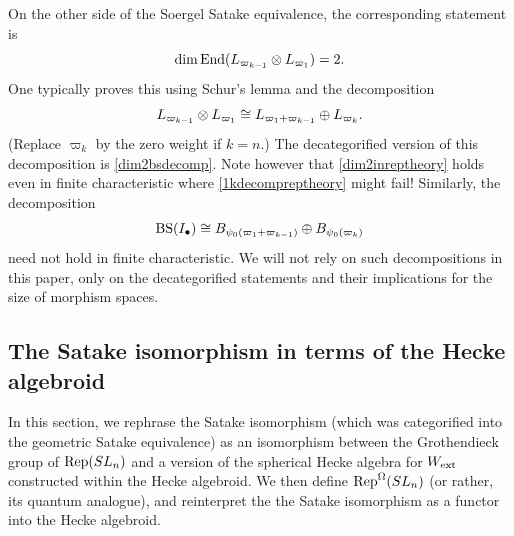 \begin{remark} \label{rmk:dim2vsrepthry} On the other side of the Soergel Satake equivalence, the corresponding statement is
\begin{equation} \label{dim2inreptheory} \dim \operatorname{End}(L_{\varpi_{k-1}} \otimes L_{\varpi_1}) = 2. \end{equation}
One typically proves this using Schur's lemma and the decomposition
\begin{equation}\label{1kdecompreptheory} L_{\varpi_{k-1}} \otimes L_{\varpi_1} \cong L_{\varpi_{1} + \varpi_{k-1}} \oplus L_{\varpi_k}. \end{equation}
(Replace $\varpi_k$ by the zero weight if $k=n$.) The decategorified version of this decomposition is \eqref{dim2bsdecomp}.
Note however that \eqref{dim2inreptheory} holds even in finite characteristic where \eqref{1kdecompreptheory} might fail! Similarly, the decomposition
\begin{equation} \operatorname{BS}(I_{\bullet}) \cong B_{\psi_0(\varpi_1 + \varpi_{k-1})} \oplus B_{\psi_0(\varpi_k)} \end{equation}
need not hold in finite characteristic. We will not rely on such decompositions in this paper, only on the decategorified statements and their implications for the size of morphism spaces.
\end{remark}


\subsection{The Satake isomorphism in terms of the Hecke algebroid}\label{subsec Satake Hecke algebroid}
In this section, we rephrase the Satake isomorphism (which was categorified into the geometric Satake equivalence) as an isomorphism between the Grothendieck group of $\operatorname{Rep}(SL_n)$ and a version of the spherical Hecke algebra for $W_{\operatorname{ext}}$ constructed within the Hecke algebroid.
We then define $\operatorname{Rep}^{\Omega}(SL_n)$ (or rather, its quantum analogue), and reinterpret the the Satake isomorphism as a functor into the Hecke algebroid.


